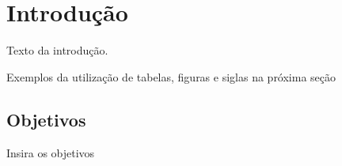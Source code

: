 \chapter{Introdução}
\label{chapter:introducao}

Texto da introdução.

Exemplos da utilização de tabelas, figuras e siglas na próxima seção

\section{Objetivos}

Insira os objetivos


